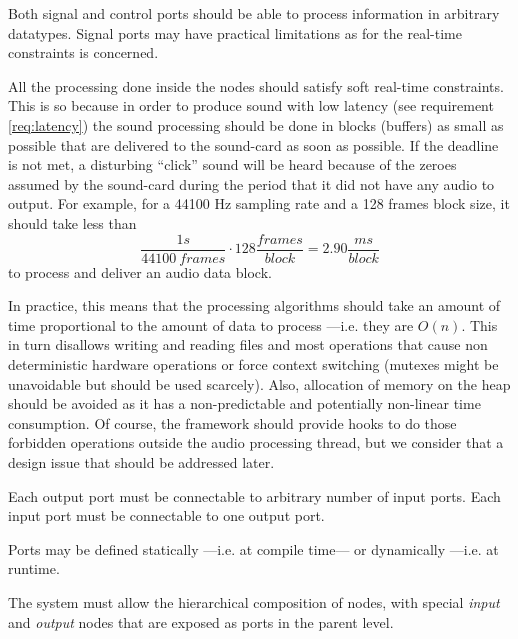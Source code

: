 \begin{requirement}
  Both signal and control ports should be able to process information
  in arbitrary datatypes. Signal ports may have practical limitations
  as for the real-time constraints is concerned.
\end{requirement}

\begin{mynote} \label{note:realtime} All the
  processing done inside the nodes should satisfy soft real-time
  constraints. This is so because in order to produce sound with low
  latency (see requirement \ref{req:latency}) the sound processing
  should be done in blocks (buffers) as small as possible that are
  delivered to the sound-card as soon as possible. If the deadline is
  not met, a disturbing ``click'' sound will be heard because of the
  zeroes assumed by the sound-card during the period that it did not
  have any audio to output. For example, for a 44100 Hz sampling rate
  and a 128 frames block size, it should take less than $$\frac{1
    s}{44100\ frames}\cdot128\frac{frames}{block}=2.90
  \frac{ms}{block}$$ to process and deliver an audio data block.

  In practice, this means that the processing algorithms should take
  an amount of time proportional to the amount of data to process
  ---i.e. they are $O(n)$. This in turn disallows writing and reading
  files and most operations that cause non deterministic hardware
  operations or force context switching (mutexes might be unavoidable
  but should be used scarcely). Also, allocation of memory on the
  heap should be avoided as it has a non-predictable and potentially
  non-linear time consumption. Of course, the framework should provide
  hooks to do those forbidden operations outside the audio processing
  thread, but we consider that a design issue that should be addressed
  later.
\end{mynote}

\begin{requirement}
Each output port must be connectable to arbitrary number of input
ports. Each input port must be connectable to one output port.
\end{requirement}

\begin{requirement}
Ports may be defined statically ---i.e. at compile time--- or
dynamically ---i.e. at runtime.
\end{requirement}

\begin{requirement}
The system must allow the hierarchical composition of nodes, with
special \emph{input} and \emph{output} nodes that are exposed as ports
in the parent level.
\end{requirement}

